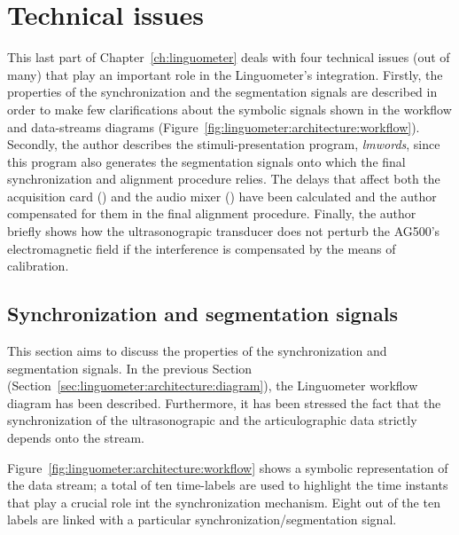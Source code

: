 \section{Technical issues}
\label{ch:linguometer:technical}
This last part of Chapter~\ref{ch:linguometer} deals with four technical issues
(out of many) that play an important role in the Linguometer's integration.
Firstly, the properties of the  synchronization and the segmentation signals 
are described in order to make few clarifications about the symbolic signals
shown in the workflow and data-streams diagrams
(Figure~\ref{fig:linguometer:architecture:workflow}).
Secondly, the author describes the stimuli-presentation program, \emph{lmwords},
since this program also generates the segmentation signals onto which the final
synchronization and alignment procedure relies.
The delays that affect both the acquisition card () and the audio mixer
() have been calculated and the author compensated for them in the final
alignment procedure.
Finally, the author briefly shows how the ultrasonograpic transducer does not
perturb the AG500's electromagnetic field if the interference is compensated by
the means of calibration.
\subsection{Synchronization and segmentation signals}
\label{sec:linguometer:technical:signals}
This section aims to discuss the properties of the synchronization and
segmentation signals. 
In the previous Section (Section~\ref{sec:linguometer:architecture:diagram}),
the Linguometer workflow diagram has been described. 
Furthermore, it has been stressed the fact that the synchronization of the 
ultrasonograpic and the articulographic data strictly depends onto the 
 stream.


Figure~\ref{fig:linguometer:architecture:workflow} shows a symbolic
representation of the data  stream; 
a total of ten time-labels are used to highlight the time instants that play a
crucial role int the synchronization mechanism. 
Eight out of the ten labels are linked with a particular
synchronization/segmentation signal.

